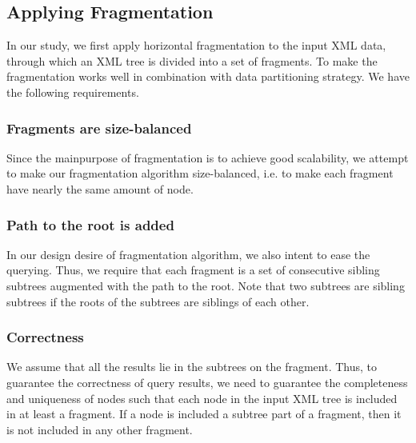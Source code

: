 \subsection{Applying Fragmentation}

In our study, we first apply horizontal fragmentation to the input XML data,
through which an XML tree is divided into a set of fragments. To make the 
fragmentation works well in combination with data partitioning strategy. We
have the following requirements.

\subsubsection{Fragments are size-balanced}

Since the mainpurpose of fragmentation is to achieve good scalability, we
attempt to make our fragmentation algorithm size-balanced, i.e. to make each
fragment have nearly the same amount of node. 

\subsubsection{Path to the root is added}

In our design desire of fragmentation algorithm, we also intent to ease the
querying. Thus, we require that each fragment is a set of consecutive
sibling subtrees augmented with the path to the root. Note that two
subtrees are sibling subtrees if the roots of the subtrees are siblings of each
other.

\subsubsection{Correctness}

We assume that all the results lie in the subtrees on the fragment. Thus,
to guarantee the correctness of query results, we need to guarantee the
completeness and uniqueness of nodes such that each node in the input XML tree
is included in at least a fragment. If a node is included a subtree part of a
fragment, then it is not included in any other fragment.


